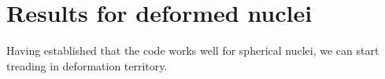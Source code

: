 \chapter{Results for deformed nuclei}
\label{chap:res_def}
Having established that the code works well for spherical nuclei, we can start treading in deformation territory.

